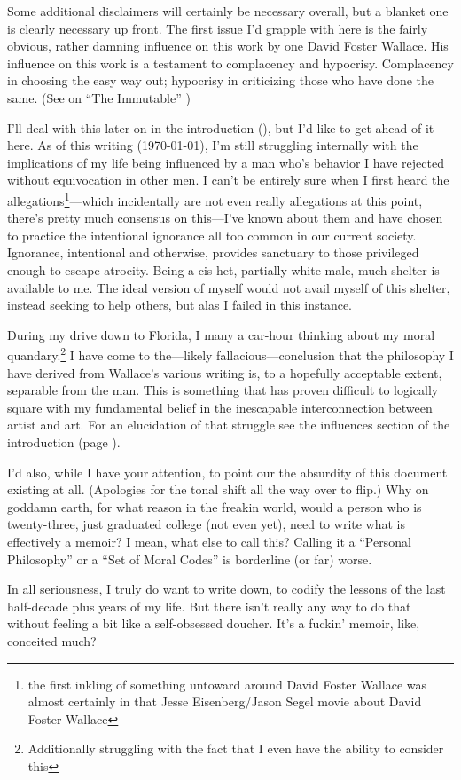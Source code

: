 \vspace*{\fill}
{\normalsize Some additional disclaimers will certainly be necessary overall, but a blanket one is clearly necessary up front.
The first issue I'd grapple with here is the fairly obvious, rather damning influence on this work by one David Foster Wallace.
His influence on this work is a testament to complacency and hypocrisy.
Complacency in choosing the easy way out; hypocrisy in criticizing those who have done the same.
(See  on ``The Immutable'' )

I'll deal with this later on in the introduction (), but I'd like to get ahead of it here.
As of this writing (\today), I'm still struggling internally with the implications of my life being influenced by a man who's behavior I have rejected without equivocation in other men.
I can't be entirely sure when I first heard the allegations\footnote{the first inkling of something untoward around David Foster Wallace was almost certainly in that Jesse Eisenberg/Jason Segel movie about David Foster Wallace}---which incidentally are not even really allegations at this point, there's pretty much consensus on this---I've known about them and have chosen to practice the intentional ignorance all too common in our current society.
Ignorance, intentional and otherwise, provides sanctuary to those privileged enough to escape atrocity.
Being a cis-het, partially-white male, much shelter is available to me.
The ideal version of myself would not avail myself of this shelter, instead seeking to help others, but alas I failed in this instance.

During my drive down to Florida, I many a car-hour thinking about my moral quandary.\footnote{Additionally struggling with the fact that I even have the ability to consider this}
I have come to the---likely fallacious---conclusion that the philosophy I have derived from Wallace's various writing is, to a hopefully acceptable extent, separable from the man.
This is something that has proven difficult to logically square with my fundamental belief in the inescapable interconnection between artist and art.
For an elucidation of that struggle see the influences section of the introduction (page \pageref{sec:influences}).

I'd also, while I have your attention, to point our the absurdity of this document existing at all.
(Apologies for the tonal shift all the way over to flip.)
Why on goddamn earth, for what reason in the freakin world, would a person who is twenty-three, just graduated college (not even yet), need to write what is effectively a memoir?
I mean, what else to call this?
Calling it a ``Personal Philosophy'' or a ``Set of Moral Codes'' is borderline (or far) worse.

In all seriousness, I truly do want to write down, to codify the lessons of the last half-decade plus years of my life.
But there isn't really any way to do that without feeling a bit like a self-obsessed doucher.
It's a fuckin' memoir, like, conceited much?}

